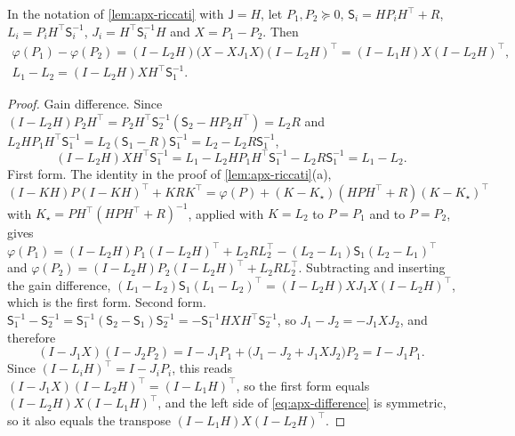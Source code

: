 \begin{lemma}\label{lem:apx-difference}
In the notation of \cref{lem:apx-riccati} with $\mathsf J=H$, let $P_1,P_2\succeq0$, $\mathsf S_i=HP_iH^\top+R$, $L_i=P_iH^\top\mathsf S_i^{-1}$, $J_i=H^\top\mathsf S_i^{-1}H$ and $X=P_1-P_2$. Then
\begin{equation}\label{eq:apx-difference}
\begin{gathered}
\varphi(P_1)-\varphi(P_2)=(I-L_2H)\bigl(X-XJ_1X\bigr)(I-L_2H)^\top=(I-L_1H)X(I-L_2H)^\top,\\
L_1-L_2=(I-L_2H)XH^\top\mathsf S_1^{-1}.
\end{gathered}
\end{equation}
\end{lemma}

\begin{proof}
Gain difference. Since $(I-L_2H)P_2H^\top=P_2H^\top\mathsf S_2^{-1}(\mathsf S_2-HP_2H^\top)=L_2R$ and $L_2HP_1H^\top\mathsf S_1^{-1}=L_2(\mathsf S_1-R)\mathsf S_1^{-1}=L_2-L_2R\mathsf S_1^{-1}$,
\begin{equation*}
(I-L_2H)XH^\top\mathsf S_1^{-1}=L_1-L_2HP_1H^\top\mathsf S_1^{-1}-L_2R\mathsf S_1^{-1}=L_1-L_2 .
\end{equation*}
First form. The identity in the proof of \cref{lem:apx-riccati}(a), $(I-KH)P(I-KH)^\top+KRK^\top=\varphi(P)+(K-K_\star)(HPH^\top+R)(K-K_\star)^\top$ with $K_\star=PH^\top(HPH^\top+R)^{-1}$, applied with $K=L_2$ to $P=P_1$ and to $P=P_2$, gives $\varphi(P_1)=(I-L_2H)P_1(I-L_2H)^\top+L_2RL_2^\top-(L_2-L_1)\mathsf S_1(L_2-L_1)^\top$ and $\varphi(P_2)=(I-L_2H)P_2(I-L_2H)^\top+L_2RL_2^\top$. Subtracting and inserting the gain difference, $(L_1-L_2)\mathsf S_1(L_1-L_2)^\top=(I-L_2H)XJ_1X(I-L_2H)^\top$, which is the first form. Second form. $\mathsf S_1^{-1}-\mathsf S_2^{-1}=\mathsf S_1^{-1}(\mathsf S_2-\mathsf S_1)\mathsf S_2^{-1}=-\mathsf S_1^{-1}HXH^\top\mathsf S_2^{-1}$, so $J_1-J_2=-J_1XJ_2$, and therefore
\begin{equation*}
(I-J_1X)(I-J_2P_2)=I-J_1P_1+\bigl(J_1-J_2+J_1XJ_2\bigr)P_2=I-J_1P_1 .
\end{equation*}
Since $(I-L_iH)^\top=I-J_iP_i$, this reads $(I-J_1X)(I-L_2H)^\top=(I-L_1H)^\top$, so the first form equals $(I-L_2H)X(I-L_1H)^\top$, and the left side of \cref{eq:apx-difference} is symmetric, so it also equals the transpose $(I-L_1H)X(I-L_2H)^\top$.
\end{proof}

